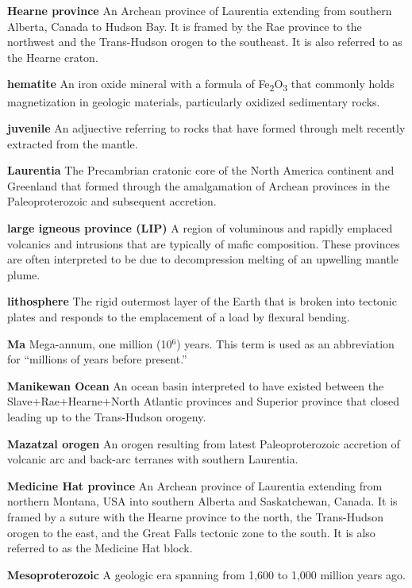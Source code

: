 \documentclass[twocolumn, switch]{article} %
\begin{document}
\noindent\textbf{Hearne province } An Archean province of Laurentia extending from southern Alberta, Canada to Hudson Bay. It is framed by the Rae province to the northwest and the Trans-Hudson orogen to the southeast. It is also referred to as the Hearne craton.

\noindent\textbf{hematite } An iron oxide mineral with a formula of Fe\textsubscript{2}O\textsubscript{3} that commonly holds magnetization in geologic materials, particularly oxidized sedimentary rocks.

\noindent\textbf{juvenile } An adjuective referring to rocks that have formed through melt recently extracted from the mantle.

\noindent\textbf{Laurentia } The Precambrian cratonic core of the North America continent and Greenland that formed through the amalgamation of Archean provinces in the Paleoproterozoic and subsequent accretion.

\noindent\textbf{large igneous province (LIP) } A region of voluminous and rapidly emplaced volcanics and intrusions that are typically of mafic composition. These provinces are often interpreted to be due to decompression melting of an upwelling mantle plume.

\noindent\textbf{lithosphere } The rigid outermost layer of the Earth that is broken into tectonic plates and responds to the emplacement of a load by flexural bending.

\noindent\textbf{Ma } Mega-annum, one million (10$^6$) years. This term is used as an abbreviation for ``millions of years before present.''

\noindent\textbf{Manikewan Ocean } An ocean basin interpreted to have existed between the  Slave+Rae+Hearne+North Atlantic provinces and Superior province that closed leading up to the Trans-Hudson orogeny.

\noindent\textbf{Mazatzal orogen } An orogen resulting from latest Paleoproterozoic accretion of volcanic arc and back-arc terranes with southern Laurentia.

\noindent\textbf{Medicine Hat province } An Archean province of Laurentia extending from northern Montana, USA into southern Alberta and Saskatchewan, Canada. It is framed by a suture with the Hearne province to the north, the Trans-Hudson orogen to the east, and the Great Falls tectonic zone to the south. It is also referred to as the Medicine Hat block.

\noindent\textbf{Mesoproterozoic } A geologic era spanning from 1,600 to 1,000 million years ago.
\end{document}
